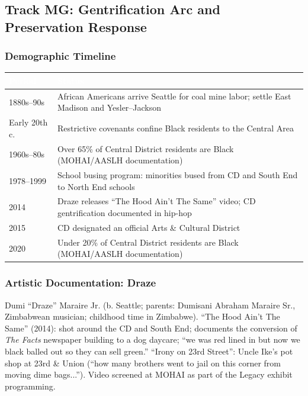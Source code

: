 \documentclass[11pt,letterpaper]{article}
\newcommand{\tableheader}[1]{\textbf{\sffamily\textcolor{white}{#1}}}
\begin{document}
\subsection{Track MG: Gentrification Arc and Preservation Response}

\subsubsection{Demographic Timeline}

\begin{center}
\begin{tabularx}{\textwidth}{L{2cm}X}
\toprule
{}
\tableheader{Period} & \tableheader{Status} \\
\midrule
1880s--90s & African Americans arrive Seattle for coal mine labor; settle East Madison and Yesler--Jackson \\
Early 20th c. & Restrictive covenants confine Black residents to the Central Area \\
1960s--80s & Over 65\% of Central District residents are Black (MOHAI/AASLH documentation) \\
1978--1999 & School busing program: minorities bused from CD and South End to North End schools \\
2014 & Draze releases ``The Hood Ain't The Same'' video; CD gentrification documented in hip-hop \\
2015 & CD designated an official Arts \& Cultural District \\
2020 & Under 20\% of Central District residents are Black (MOHAI/AASLH documentation) \\
\bottomrule
\end{tabularx}
\end{center}

\subsubsection{Artistic Documentation: Draze}

Dumi ``Draze'' Maraire Jr. (b. Seattle; parents: Dumisani Abraham Maraire Sr., Zimbabwean musician;
childhood time in Zimbabwe). ``The Hood Ain't The Same'' (2014): shot around the CD and South End;
documents the conversion of \textit{The Facts} newspaper building to a dog daycare; ``we was red lined
in but now we black balled out so they can sell green.'' ``Irony on 23rd Street'': Uncle Ike's pot shop
at 23rd \& Union (``how many brothers went to jail on this corner from moving dime bags...'').
Video screened at MOHAI as part of the Legacy exhibit programming.
\end{document}
